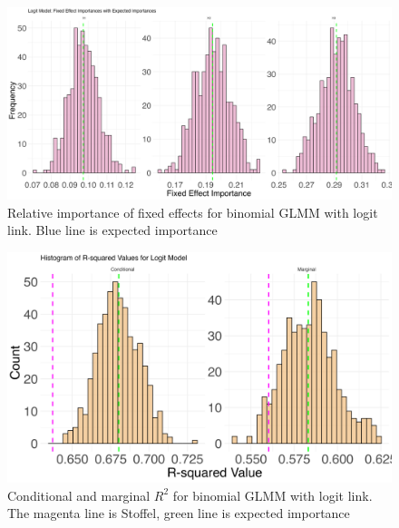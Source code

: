 \begin{figure}[H]
    \centering
      \includegraphics[width=0.7\linewidth]{Figures/Simulation study/Fixed_logit.png}
      \caption{Relative importance of fixed effects for binomial GLMM with logit link. Blue line is expected importance}
      \label{fig:relimp_binomial_logit_fixed}
  \end{figure}
  \begin{figure}[H]\ContinuedFloat
    \centering
    \includegraphics[width=0.7\linewidth]{Figures/Simulation study/R2_logit.png}
    \caption{Conditional and marginal $R^2$ for binomial GLMM with logit link. The magenta line is Stoffel, green line is expected importance}
      \label{fig:relimp_binomial_logit_r2}
  \end{figure}


